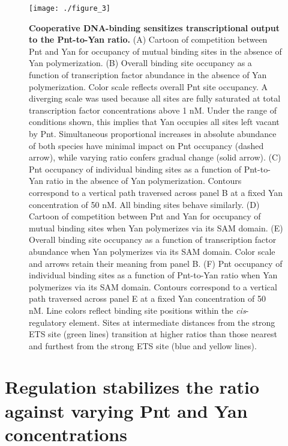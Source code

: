 \begin{figure}[h!]
\centering
\texttt{[image: ./figure\_3]}
\caption[Cooperative DNA-binding sensitizes promoters to the Pnt-to-Yan ratio.]{\textbf{Cooperative DNA-binding sensitizes transcriptional output to the Pnt-to-Yan ratio.} (A) Cartoon of competition between Pnt and Yan for occupancy of mutual binding sites in the absence of Yan polymerization. (B) Overall binding site occupancy as a function of transcription factor abundance in the absence of Yan polymerization. Color scale reflects overall Pnt site occupancy. A diverging scale was used because all sites are fully saturated at total transcription factor concentrations above 1 nM. Under the range of conditions shown, this implies that Yan occupies all sites left vacant by Pnt. Simultaneous proportional increases in absolute abundance of both species have minimal impact on Pnt occupancy (dashed arrow), while varying ratio confers gradual change (solid arrow). (C) Pnt occupancy of individual binding sites as a function of Pnt-to-Yan ratio in the absence of Yan polymerization. Contours correspond to a vertical path traversed across panel B at a fixed Yan concentration of 50 nM. All binding sites behave similarly. (D) Cartoon of competition between Pnt and Yan for occupancy of mutual binding sites when Yan polymerizes via its SAM domain. (E) Overall binding site occupancy as a function of transcription factor abundance when Yan polymerizes via its SAM domain. Color scale and arrows retain their meaning from panel B. (F) Pnt occupancy of individual binding sites as a function of Pnt-to-Yan ratio when Yan polymerizes via its SAM domain. Contours correspond to a vertical path traversed across panel E at a fixed Yan concentration of 50 nM. Line colors reflect binding site positions within the \textit{cis}-regulatory element. Sites at intermediate distances from the strong ETS site (green lines) transition at higher ratios than those nearest and furthest from the strong ETS site (blue and yellow lines).}
\label{fig:ratio:fig3}
\end{figure}

\section{Regulation stabilizes the ratio against varying Pnt and Yan concentrations}


